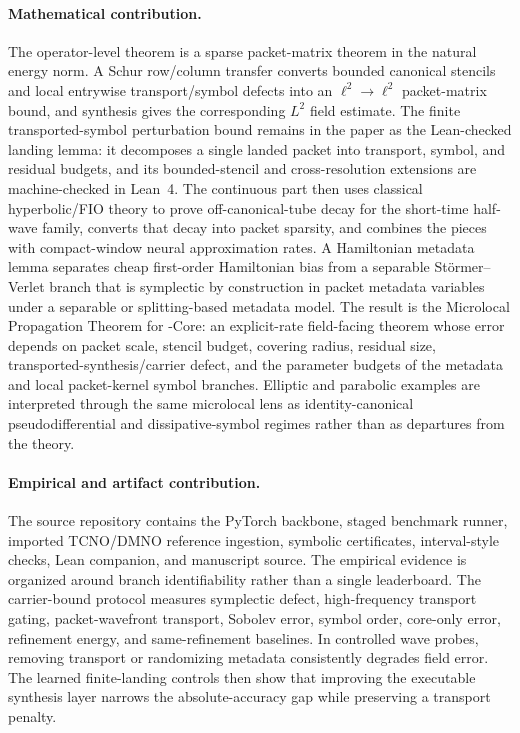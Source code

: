 \paragraph{Mathematical contribution.}
The operator-level theorem is a sparse packet-matrix theorem in the natural energy norm.  A Schur row/column transfer converts bounded canonical stencils and local entrywise transport/symbol defects into an $\ell^2\to\ell^2$ packet-matrix bound, and synthesis gives the corresponding $L^2$ field estimate.  The finite transported-symbol perturbation bound remains in the paper as the Lean-checked landing lemma: it decomposes a single landed packet into transport, symbol, and residual budgets, and its bounded-stencil and cross-resolution extensions are machine-checked in Lean~4. The continuous part then uses classical hyperbolic/FIO theory to prove off-canonical-tube decay for the short-time half-wave family, converts that decay into packet sparsity, and combines the pieces with compact-window neural approximation rates. A Hamiltonian metadata lemma separates cheap first-order Hamiltonian bias from a separable St\"ormer--Verlet branch that is symplectic by construction in packet metadata variables under a separable or splitting-based metadata model. The result is the Microlocal Propagation Theorem for \MiNO-Core: an explicit-rate field-facing theorem whose error depends on packet scale, stencil budget, covering radius, residual size, transported-synthesis/carrier defect, and the parameter budgets of the metadata and local packet-kernel symbol branches.  Elliptic and parabolic examples are interpreted through the same microlocal lens as identity-canonical pseudodifferential and dissipative-symbol regimes rather than as departures from the theory.

\paragraph{Empirical and artifact contribution.}
The source repository contains the PyTorch backbone, staged benchmark runner, imported TCNO/DMNO reference ingestion, symbolic certificates, interval-style checks, Lean companion, and manuscript source. The empirical evidence is organized around branch identifiability rather than a single leaderboard.  The carrier-bound protocol measures symplectic defect, high-frequency transport gating, packet-wavefront transport, Sobolev error, symbol order, core-only error, refinement energy, and same-refinement baselines.  In controlled wave probes, removing transport or randomizing metadata consistently degrades field error.  The learned finite-landing controls then show that improving the executable synthesis layer narrows the absolute-accuracy gap while preserving a transport penalty.

